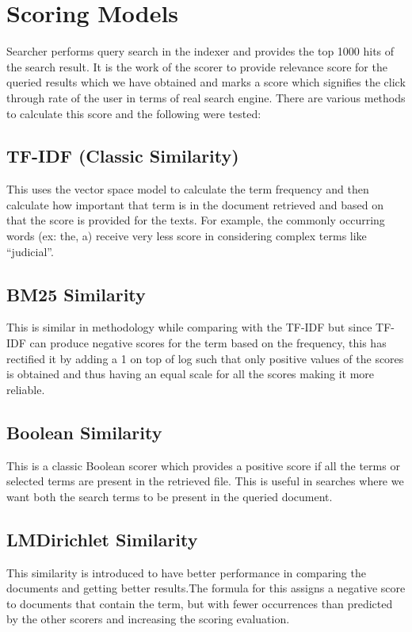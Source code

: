 \section{Scoring Models}

Searcher performs query search in the indexer and provides the top 1000 hits of the search result. It is the work of the scorer to provide relevance score for the queried results which we have obtained and marks a score which signifies the click through rate of the user in terms of real search engine. There are various methods to calculate this score and the following were tested:

\subsection{TF-IDF (Classic Similarity)}

This uses the vector space model to calculate the term frequency and then calculate how important that term is in the document retrieved and based on that the score is provided for the texts. For example, the commonly occurring words (ex: the, a) receive very less score in considering complex terms like “judicial”.

\subsection{BM25 Similarity}

This is similar in methodology while comparing with the TF-IDF but since TF-IDF can produce negative scores for the term based on the frequency, this has rectified it by adding a 1 on top of log such that only positive values of the scores is obtained and thus having an equal scale for all the scores making it more reliable.

\subsection{Boolean Similarity}

This is a classic Boolean scorer which provides a positive score if all the terms or selected terms are present in the retrieved file. This is useful in searches where we want both the search terms to be present in the queried document.

\subsection{LMDirichlet Similarity}

This similarity is introduced to have better performance in comparing the documents and getting better results.The formula for this assigns a negative score to documents that contain the term, but with fewer occurrences than predicted by the other scorers and increasing the scoring evaluation.

